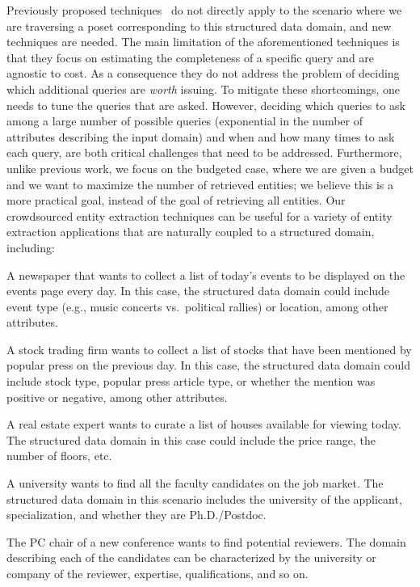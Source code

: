 Previously proposed techniques~\cite{trushkowsky:2013} do not directly apply to the scenario where we are traversing a poset corresponding to this structured data domain, and new techniques are needed. The main limitation of the aforementioned techniques is that they focus on estimating the completeness of a specific query and are agnostic to cost. As a consequence they do not address the problem of deciding which additional queries are \emph{worth} issuing.  To mitigate these shortcomings, one needs to tune the queries that are asked. However, deciding which queries to ask among a large number of possible queries (exponential in the number of attributes describing the input domain) and when and how many times to ask each query, are both critical challenges that need to be addressed. Furthermore, unlike previous work, we focus on the budgeted case, where we are given a budget and we want to maximize the number of retrieved entities; we believe this is a more practical goal, instead of the goal of retrieving all entities.  
\iftr
Our crowdsourced entity extraction techniques can be useful for a variety of entity extraction applications that are naturally coupled to a structured domain, including:
\squishlist
\item A newspaper that wants to collect a list of today's events to be displayed on the events page every day. 
In this case, the structured data domain could include event type (e.g., music concerts vs.~political rallies) or location, among other attributes.
\item A stock trading firm wants to collect a list of stocks that have been mentioned by popular press on the previous day. In this case, the structured data domain could include stock type, popular press article type, or whether the mention was positive or negative, among other attributes. 
\item A real estate expert wants to curate a list of houses available for viewing today. The structured data domain in this case could include the price range, the number of floors, etc.
\item A university wants to find all the faculty candidates on the job market. The structured data domain in this scenario includes the university of the applicant, specialization, and whether they are Ph.D./Postdoc.
\item The PC chair of a new conference wants to find potential reviewers. The domain describing each of the candidates can be characterized by the university or company of the reviewer, expertise, qualifications, and so on. 
\squishend
\fi

